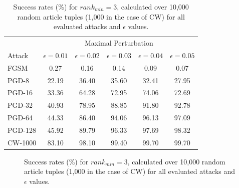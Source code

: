 \begin{table}[H]
	\centering
	\begin{tabular}{ lccccc } 
		\toprule		
		& \multicolumn{5}{c}{Maximal Perturbation} \\
		\cmidrule{2-6}
		Attack & $\epsilon = 0.01$ & $\epsilon = 0.02$ & $\epsilon = 0.03$  & $\epsilon = 0.04$ & $\epsilon = 0.05$  \\
		\midrule
		FGSM & 0.27 & 0.16 & 0.14 & 0.09 & 0.07 \\
		PGD-8 & 22.19 & 36.40 & 35.60 & 32.41 & 27.95 \\
		PGD-16 & 33.36 & 64.28 & 72.95 & 74.06 & 72.69 \\
		PGD-32 & 40.93 & 78.95 & 88.85 & 91.80 & 92.78 \\
		PGD-64 & 44.33 & 86.40 & 94.06 & 96.13 & 97.09 \\
		PGD-128 & 45.92 & 89.79 & 96.33 & 97.69 & 98.32 \\
		CW-1000 & 83.10 & 98.10 & 99.40 & 99.70 & 99.70 \\
		\bottomrule
	\end{tabular}
	\caption{Success rates (\%) for $rank_{min}=3$, calculated over 10,000 random article tuples (1,000 in the case of \acs{CW}) for all evaluated attacks and $\epsilon$ values.}
	\label{tab:attack-results}
\end{table}

\begin{figure}[H]
	\centering
	
	\caption{Success rates (\%) for $rank_{min}=3$, calculated over 10,000 random article tuples (1,000 in the case of \acs{CW}) for all evaluated attacks and $\epsilon$ values.}
	\label{fig:top3-normal-success}
\end{figure}

